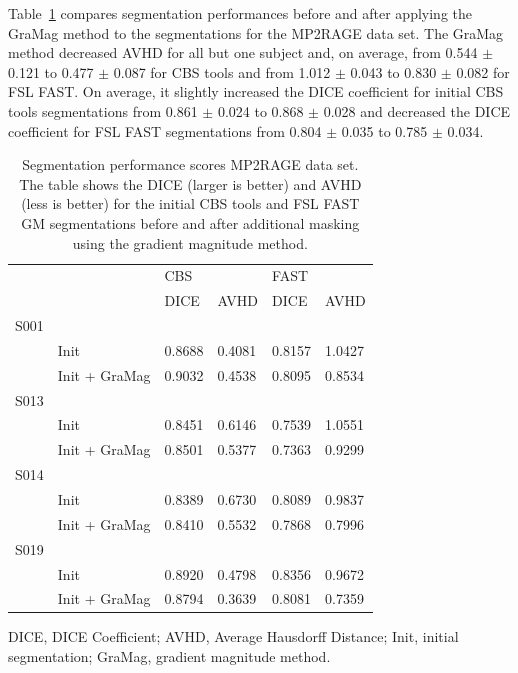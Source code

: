 Table~\ref{tab:table2} compares segmentation performances before and after applying the GraMag method to the segmentations for the MP2RAGE data set. The GraMag method decreased AVHD for all but one subject and, on average, from 0.544 $\pm$ 0.121 to 0.477 $\pm$ 0.087 for CBS tools and from 1.012 $\pm$ 0.043 to 0.830 $\pm$ 0.082 for FSL FAST. On average, it slightly increased the DICE coefficient for initial CBS tools segmentations from 0.861 $\pm$ 0.024 to 0.868 $\pm$ 0.028 and decreased the DICE coefficient for FSL FAST segmentations from 0.804 $\pm$ 0.035 to 0.785 $\pm$ 0.034.

\begin{table}[!ht]
\centering
\caption{
Segmentation performance scores MP2RAGE data set. The table shows the DICE (larger is better) and AVHD (less is better) for the initial CBS tools and FSL FAST GM segmentations before and after additional masking using the gradient magnitude method.}
\begin{tabular}{llllll}
\hline
     &                 & \vline CBS   &      & \vline FAST   &      \\
     &                 & \vline DICE  & AVHD & \vline DICE       & AVHD \\
\hline
 S001 &                &            &            &             &             \\
      & Init           & 0.8688     & 0.4081     & 0.8157      & 1.0427      \\
      & Init + GraMag  & 0.9032     & 0.4538     & 0.8095      & 0.8534      \\
 S013 &                &            &            &             &             \\
      & Init           & 0.8451     & 0.6146     & 0.7539      & 1.0551      \\
      & Init + GraMag  & 0.8501     & 0.5377     & 0.7363      & 0.9299      \\
 S014 &                &            &            &             &             \\
      & Init           & 0.8389     & 0.6730     & 0.8089      & 0.9837      \\
      & Init + GraMag  & 0.8410     & 0.5532     & 0.7868      & 0.7996      \\
 S019 &                &            &            &             &             \\
      & Init           & 0.8920     & 0.4798     & 0.8356      & 0.9672      \\
      & Init + GraMag  & 0.8794     & 0.3639     & 0.8081      & 0.7359      \\
\hline
\end{tabular}
\begin{flushleft}
DICE, DICE Coefficient; AVHD, Average Hausdorff Distance; Init, initial segmentation; GraMag, gradient magnitude method.\\
\end{flushleft}
\label{tab:table2}
\end{table}

